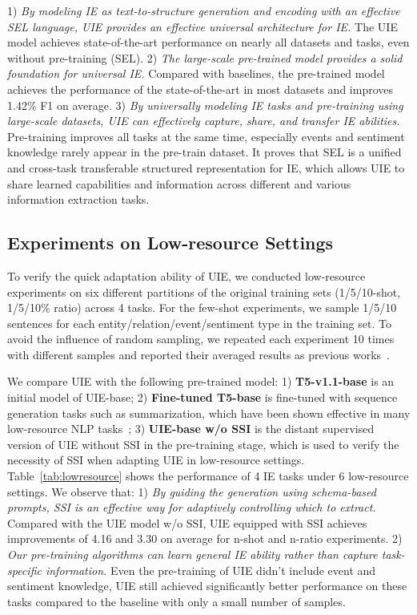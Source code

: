 \documentclass[11pt]{article}
\begin{document}
1)
\textit{By modeling IE as text-to-structure generation and encoding with an effective SEL language, UIE provides an effective universal architecture for IE.}
The UIE model achieves state-of-the-art performance on nearly all datasets and tasks, even without pre-training (SEL).
2)
\textit{The large-scale pre-trained model provides a solid foundation for universal IE.}
Compared with baselines, the pre-trained model achieves the performance of the state-of-the-art in most datasets and improves 1.42\% F1 on average.
3) 
\textit{By universally modeling IE tasks and pre-training using large-scale datasets, UIE can effectively capture, share, and transfer IE abilities.}
Pre-training improves all tasks at the same time, especially events and sentiment knowledge rarely appear in the pre-train dataset.
It proves that SEL is a unified and cross-task transferable structured representation for IE, which allows UIE to share learned capabilities and information across different and various information extraction tasks.


\subsection{Experiments on Low-resource Settings}

To verify the quick adaptation ability of UIE, we conducted low-resource experiments on six different partitions of the original training sets (1/5/10-shot, 1/5/10\% ratio) across 4 tasks.
For the few-shot experiments, we sample 1/5/10 sentences for each entity/relation/event/sentiment type in the training set.
To avoid the influence of random sampling, we repeated each experiment 10 times with different samples and reported their averaged results as previous works~\citep{huang-etal-2021-shot}.

We compare UIE with the following pre-trained model: 1) \textbf{T5-v1.1-base} is an initial model of UIE-base; 2) \textbf{Fine-tuned T5-base} is fine-tuned with sequence generation tasks such as summarization, which have been shown effective in many low-resource NLP tasks~\cite{paolini2021structured}; 3) \textbf{UIE-base w/o SSI} is the distant supervised version of UIE without SSI in the pre-training stage, which is used to verify the necessity of SSI when adapting UIE in low-resource settings.
Table~\ref{tab:lowresource} shows the performance of 4 IE tasks under 6 low-resource settings. 
We observe that:
1) \textit{By guiding the generation using schema-based prompts, SSI is an effective way for adaptively controlling which to extract.}
Compared with the UIE model w/o SSI, UIE equipped with SSI achieves improvements of 4.16 and 3.30 on average for n-shot and n-ratio experiments.
2) \textit{Our pre-training algorithms can learn general IE ability rather than capture task-specific information.}
Even the pre-training of UIE didn't include event and sentiment knowledge, UIE still achieved significantly better performance on these tasks compared to the baseline with only a small number of samples.
\end{document}
